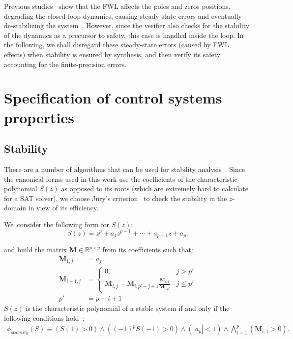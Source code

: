 \documentclass[sigconf]{llncs}
\newcommand{\mat}[1]{\boldsymbol{#1}}
\begin{document}
Previous studies~\cite{gangli1} show that the FWL affects the poles and
zeros positions, degrading the closed-loop dynamics, causing steady-state
errors and eventually de-stabilizing the system~\cite{Bessa16}.  However,
since the verifier also checks for the stability of the dynamics as a
precursor to safety, this case is handled inside the loop.  In the
following, we shall disregard these steady-state errors (caused by FWL
effects) when stability is ensured by synthesis, and then verify its safety
accounting for the finite-precision errors.

\section{Specification of control systems properties} 
\label{sec:specification}

\subsection{Stability} 
\label{ssec:stabspecification}

There are a number of algorithms that can be
used for stability analysis~\cite{daes20161,Bessa16}.
Since the canonical forms used in this work use the coefficients of the
characteristic polynomial $S(z)$ as opposed to its roots (which are
extremely hard to calculate for a SAT solver), we choose Jury's
criterion~\cite{astrom1997computer} to check the stability in the
$z$-domain in view of its efficiency.

We~consider the following form for $S(z)$:
%
\begin{equation*}
S(z) = z^{p}+a_1z^{p-1}+\cdots+a_{p-1}z+a_p.
\end{equation*}

and build the matrix
$\mat{M} \in \mathbb{R}^{p \times p}$ from its coefficients such that:
%
\begin{align*}
\mat{M}_{1,j}&=a_j\\
\mat{M}_{i+1,j}&=\left\{
\begin{array}{ll}
0,&j>p'\\
\mat{M}_{i,j}-\mat{M}_{i,p'-j+1}\frac{\mat{M}_{i,1}}{\mat{M}_{i,p'}} &j\leq p'
\end{array}
\right.\\
p'&=p-i+1
\end{align*}
%
$S(z)$ is the characteristic polynomial of a stable system if and
only if the following conditions hold~\cite{astrom1997computer}:
\begin{align*}
\phi_\mathit{stability}(S) \equiv
(S(1) > 0) \wedge ((-1)^p S(-1) > 0) \wedge (|a_p| < 1) \wedge \bigwedge\limits_{i=1}^p (\mat{M}_{i,1} > 0).
\end{align*}
\end{document}
